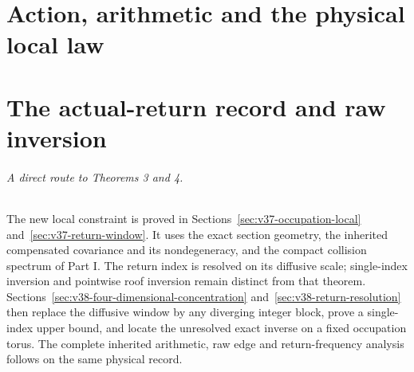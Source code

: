 \documentclass[11pt,reqno]{amsart}
\numberwithin{equation}{section}
\theoremstyle{definition}\newtheorem{definition}[theorem]{Definition}
\theoremstyle{remark}\newtheorem{remark}[theorem]{Remark}
\begin{document}
\part{Action, arithmetic and the physical local law}









\part{The actual-return record and raw inversion}
\paragraph{A direct route to Theorems 3 and 4.}
The new local constraint is proved in
Sections~\ref{sec:v37-occupation-local} and~\ref{sec:v37-return-window}.
It uses the exact section geometry, the inherited compensated
covariance and its nondegeneracy, and the compact collision spectrum
of Part I. The return index is resolved on its diffusive scale;
single-index inversion and pointwise roof inversion remain distinct
from that theorem. Sections~\ref{sec:v38-four-dimensional-concentration}
and~\ref{sec:v38-return-resolution} then replace the diffusive window
by any diverging integer block, prove a single-index upper bound, and
locate the unresolved exact inverse on a fixed occupation torus. The complete inherited arithmetic, raw edge and
return-frequency analysis follows on the same physical record.

















\end{document}
